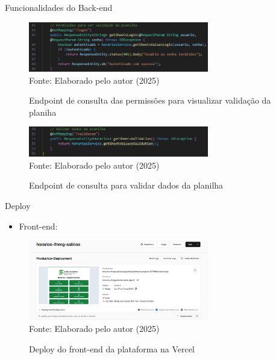 \begin{frame}{Funcionalidades do Back-end}
    \begin{figure}
        \centering
        \vspace{-0.3cm}
        \caption{Endpoint de consulta das permissões para visualizar validação da planiha}
        \vspace{-0.2cm}
        \includegraphics[width=0.7\textwidth]{figuras/back-7.png}
        \\ %
        \small Fonte: Elaborado pelo autor (2025)
    \end{figure}
    \begin{figure}
        \centering
        \vspace{-0.5cm}
        \caption{Endpoint de consulta para validar dados da planilha}
        \vspace{-0.2cm}
        \includegraphics[width=0.7\textwidth]{figuras/back-8.png}
        \\ %
        \small Fonte: Elaborado pelo autor (2025)
    \end{figure}
\end{frame}

\begin{frame}{Deploy}
    \begin{itemize}
		\item Front-end:
	\end{itemize}
    \begin{figure}
        \centering
        \vspace{-0.3cm}
        \caption{Deploy do front-end da plataforma na Vercel}
        \vspace{-0.2cm}
        \includegraphics[width=0.7\textwidth]{figuras/deploy-1.png}
        \\ %
        \small Fonte: Elaborado pelo autor (2025)
    \end{figure}
\end{frame}

